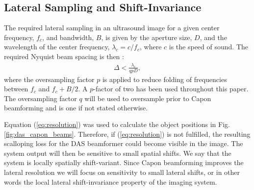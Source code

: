 \documentclass[draftcls]{IEEEtran}
\newcommand{\mat}[1]{\mathbf{#1}}
\renewcommand{\vec}[1]{\mathbf{#1}}
\begin{document}

\subsection{Lateral Sampling and Shift-Invariance}

The required lateral sampling in an ultrasound image for a given center frequency, $f_c$, and bandwidth, $B$, is given by the aperture size, $D$, and the wavelength of the center frequency, $\lambda_c = c/f_c$, where $c$ is the speed of sound. The required Nyquist beam spacing is then \cite{Hergum2007}:
\begin{align}
\Delta < \frac{\lambda_c}{qpD}, \label{eq:resolution}
\end{align}
where the oversampling factor $p$ is applied to reduce folding of frequencies between $f_c$ and $f_c + B/2$. A $p$-factor of two has been used throughout this paper. The oversampling factor $q$ will be used to oversample prior to Capon beamforming and is one if not stated otherwise. 

Equation (\ref{eq:resolution}) was used to calculate the object positions in Fig.\,\ref{fig:das_capon_beams}. Therefore, if (\ref{eq:resolution}) is not fulfilled, the resulting scalloping loss for the DAS beamformer could become visible in the image. The system output will then be sensitive to small spatial shifts. We say that the system is locally spatially shift-variant. Since Capon beamforming improves the lateral resolution we will focus on sensitivity to small lateral shifts, or in other words the local lateral shift-invariance property of the imaging system.%
\end{document}
